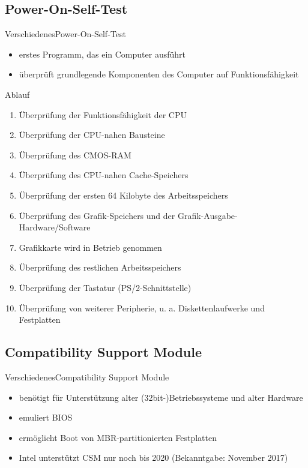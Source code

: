 \documentclass[9pt]{beamer}
\begin{document}
    \subsection{Power-On-Self-Test}
        \begin{frame}{Verschiedenes}{Power-On-Self-Test}
        \begin{itemize}
            \item erstes Programm, das ein Computer ausführt
            \item überprüft grundlegende Komponenten des Computer auf Funktionsfähigkeit
        \end{itemize}
        \begin{exampleblock}{Ablauf}
            \begin{enumerate}
                \item Überprüfung der Funktionsfähigkeit der CPU\\
                \item Überprüfung der CPU-nahen Bausteine
                \item Überprüfung des CMOS-RAM
                \item Überprüfung des CPU-nahen Cache-Speichers
                \item Überprüfung der ersten 64 Kilobyte des Arbeitsspeichers
                \item Überprüfung des Grafik-Speichers und der Grafik-Ausgabe-Hardware/Software
                \item Grafikkarte wird in Betrieb genommen
                \item Überprüfung des restlichen Arbeitsspeichers 
                \item Überprüfung der Tastatur (PS/2-Schnittstelle)
                \item Überprüfung von weiterer Peripherie, u. a. Diskettenlaufwerke und Festplatten
            \end{enumerate}
        \end{exampleblock}
        \end{frame}
        
        \subsection{Compatibility Support Module}
        \begin{frame}{Verschiedenes}{Compatibility Support Module}
            \begin{itemize}
                \item benötigt für Unterstützung alter (32bit-)Betriebssysteme und alter Hardware
                \item emuliert BIOS
                \item ermöglicht Boot von MBR-partitionierten Festplatten
                \item Intel unterstützt CSM nur noch bis 2020 (Bekanntgabe: November 2017)
            \end{itemize}
        \end{frame}
\end{document}
